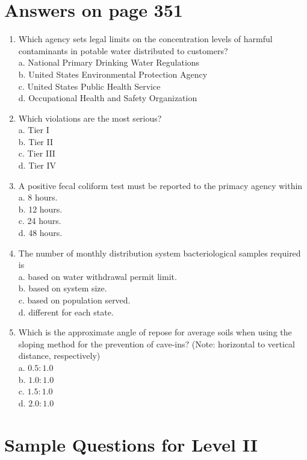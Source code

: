 \documentclass[10pt]{article}
\begin{document}
\section{Answers on page 351}
\begin{enumerate}
  \item Which agency sets legal limits on the concentration levels of harmful contaminants in potable water distributed to customers?\\
a. National Primary Drinking Water Regulations\\
b. United States Environmental Protection Agency\\
c. United States Public Health Service\\
d. Occupational Health and Safety Organization

  \item Which violations are the most serious?\\
a. Tier I\\
b. Tier II\\
c. Tier III\\
d. Tier IV

  \item A positive fecal coliform test must be reported to the primacy agency within\\
a. 8 hours.\\
b. 12 hours.\\
c. 24 hours.\\
d. 48 hours.

  \item The number of monthly distribution system bacteriological samples required is\\
a. based on water withdrawal permit limit.\\
b. based on system size.\\
c. based on population served.\\
d. different for each state.

  \item Which is the approximate angle of repose for average soils when using the sloping method for the prevention of cave-ins? (Note: horizontal to vertical distance, respectively)\\
a. $0.5: 1.0$\\
b. $1.0: 1.0$\\
c. $1.5: 1.0$\\
d. $2.0: 1.0$

\end{enumerate}

\section{Sample Questions for Level II}
\end{document}
